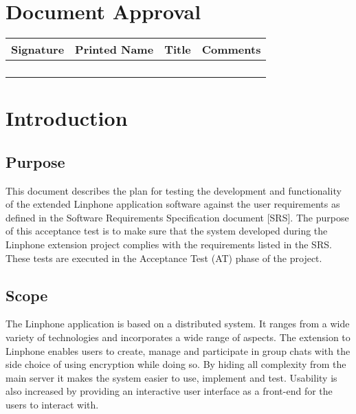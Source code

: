\documentclass[11pt]{article}
\begin{document}
\section{Document Approval}
\begin{table}[h]
\begin{tabular}{llll}
\textbf{Signature}     & \textbf{Printed Name} & \textbf{Title}        & \textbf{Comments}     \\ \hline
\multicolumn{1}{|l|}{} & \multicolumn{1}{L{3.5cm}|}{} & \multicolumn{1}{L{3.5cm}|}{} & \multicolumn{1}{L{4cm}|}{} \\ \hline
\multicolumn{1}{|l|}{} & \multicolumn{1}{l|}{} & \multicolumn{1}{l|}{} & \multicolumn{1}{l|}{} \\ \hline
\multicolumn{1}{|l|}{} & \multicolumn{1}{l|}{} & \multicolumn{1}{l|}{} & \multicolumn{1}{l|}{} \\ \hline
\multicolumn{1}{|l|}{} & \multicolumn{1}{l|}{} & \multicolumn{1}{l|}{} & \multicolumn{1}{l|}{} \\ \hline
\end{tabular}
\end{table}

\newpage

\section{Introduction}
\subsection{Purpose}
This document describes the plan for testing the development and functionality of the extended Linphone application software against the
user requirements as defined in the Software Requirements Specification document [SRS]. The purpose of this acceptance test is to make sure
that the system developed during the Linphone extension project complies with the requirements listed in the SRS. These tests are executed in the Acceptance Test (AT) phase of the project.

\subsection{Scope}
The Linphone application is based on a distributed system. It ranges from a wide variety of technologies and incorporates a wide range of aspects. The extension to Linphone enables users to create, manage and participate in group chats with the side choice of using encryption while doing so. By hiding all complexity from the main server it makes the system easier to use, implement and test. Usability is also increased by providing an interactive user interface as a front-end for the users to interact with.
\end{document}
